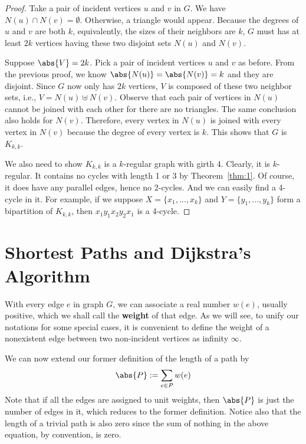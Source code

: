 \documentclass[thmcnt=section, 12pt, color=cyan]{my-elegantbook}
\begin{document}
\begin{proof}
    Take a pair of incident vertices $u$ and $v$ in $G$.
	We have $N(u) \cap N(v) = \emptyset$. 
	Otherwise, a triangle would appear. 
	Because the degrees of $u$ and  $v$ are both $k$,
	equivalently, the sizes of their neighbors are $k$,
	$G$ must has at least $2k$ vertices 
	having these two disjoint sets $N(u)$ and $N(v)$.

	Suppose $\abs{V} = 2k$. 
	Pick a pair of incident vertices $u$ and $v$ as before.
	From the previous proof, we know
	$\abs{N(u)} = \abs{N(v)} = k$ and they are disjoint.
	Since  $G$ now only has  $2k$ vertices,
	$V$ is composed of
	these two neighbor sets, i.e., $V = N(u) \uplus N(v)$.
	Observe that each pair of vertices in  $N(u)$
	cannot be joined with each other for 
	there are no triangles.
	The same conclusion also holds for $N(v)$.
	Therefore, every vertex in 
	$N(u)$ is joined with every vertex in $N(v)$
	because the degree of every vertex is $k$.
	This shows that $G$ is  $K_{k,k}$.

	We also need to show $K_{k,k}$ is a $k$-regular graph with girth 4.
	Clearly, it is $k$-regular. 
	It contains no cycles with length 1 or 3 by Theorem~\ref{thm:1}.
	Of course, it does have any parallel edges, 
	hence no 2-cycles.
	And we can easily find a 4-cycle in it.
	For example, if we suppose 
	$X=\{x_1,\ldots,x_k\}$ and $Y=\{y_1,\ldots,y_k\}$ 
	form a bipartition of $K_{k,k}$, then 
	$x_1 y_1 x_2 y_2 x_1$ is a 4-cycle.
\end{proof}


\section{Shortest Paths and Dijkstra's Algorithm}

With every edge $e$ in graph $G$, we can associate a real number $w(e)$, usually positive, which we shall call the \textbf{weight} of that edge. As we will see, to unify our notations for some special cases, it is convenient to define the weight of a nonexistent edge between two non-incident vertices as infinity $\infty$. 

We can now extend our former definition of the length of a path by 
\begin{align*}
    \abs{P} := \sum_{e \in P} w(e)
\end{align*}
Note that if all the edges are assigned to unit weights, then $\abs{P}$ is just the number of edges in it, which reduces to the former definition. Notice also that the length of a trivial path is also zero since the sum of nothing in the above equation, by convention, is zero.
\end{document}
